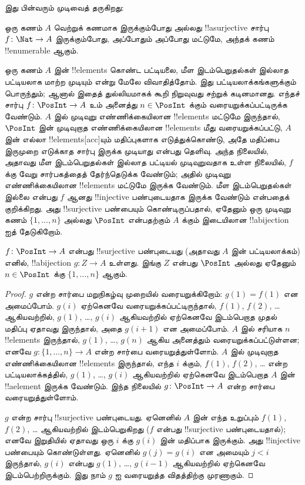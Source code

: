 \documentclass[../../../include/open-logic-section]{subfiles}
\begin{document}
இது பின்வரும் முடிவைத் தருகிறது:

\begin{cor}
ஒரு கணம் $A$ வெற்றுக் கணமாக இருக்கும்போது அல்லது
!!a{surjective} சார்பு $f\colon \Nat \to A$ இருக்கும்போது,
அப்போதும் அப்போது மட்டுமே, அந்தக் கணம் !!{enumerable} ஆகும்.
\end{cor}

ஒரு கணம் $A$ இன் !!{element}s கொண்ட பட்டியலை,
மீள இடம்பெறுதல்கள் இல்லாத பட்டியலாக மாற்ற முடியும் என்று
மேலே விவாதித்தோம். இது பட்டியலாக்கங்களுக்கும் பொருந்தும்;
ஆனால் இதைத் துல்லியமாகக் கூறி நிறுவுவது சற்றுக் கடினமானது.
எந்தச் சார்பு $f\colon \PosInt \to A$ உம்
அனைத்து $n \in
\PosInt$ க்கும் வரையறுக்கப்பட்டிருக்க வேண்டும்.
$A$ இல் முடிவுறு எண்ணிக்கையிலான !!{element}s மட்டுமே இருந்தால்,
$\PosInt$ இன் முடிவுறாத எண்ணிக்கையிலான !!{element}s மீது
வரையறுக்கப்பட்டு, $A$ இன் எல்லா !!{element}s[acc]யும் மதிப்புகளாக
எடுத்துக்கொண்டு, அதே மதிப்பை இருமுறை எடுக்காத சார்பு
இருக்க முடியாது என்பது தெளிவு.
அந்த நிலையில், அதாவது மீள இடம்பெறுதல்கள் இல்லாத பட்டியல்
முடிவுறுவதாக உள்ள நிலையில், $f$ க்கு வேறு சார்பகத்தைத்
தேர்ந்தெடுக்க வேண்டும்; அதில் முடிவுறு எண்ணிக்கையிலான
!!{element}s மட்டுமே இருக்க வேண்டும்.
மீள இடம்பெறுதல்கள் இல்லை என்பது $f$ ஆனது !!{injective}
பண்புடையதாக இருக்க வேண்டும் என்பதைக் குறிக்கிறது.
அது !!{surjective} பண்பையும் கொண்டிருப்பதால்,
ஏதேனும் ஒரு முடிவுறு கணம் $\{1, \dots, n\}$ அல்லது
$\PosInt$ என்பதற்கும் $A$ க்கும் இடையிலான
!!a{bijection} ஐத் தேடுகிறோம்.

\begin{prop}
$f\colon \PosInt \to A$ என்பது !!{surjective} பண்புடையது
(அதாவது $A$ இன் பட்டியலாக்கம்) எனில்,
!!a{bijection} $g\colon Z \to A$ உள்ளது.
இங்கு $Z$ என்பது $\PosInt$ அல்லது ஏதேனும்
$n \in \PosInt$ க்கு $\{1, \dots, n\}$ ஆகும்.
\end{prop}

\begin{proof}
$g$ என்ற சார்பை மறுநிகழ்வு முறையில் வரையறுக்கிறோம்:
$g(1) = f(1)$ என அமைப்போம்.
$g(i)$ ஏற்கெனவே வரையறுக்கப்பட்டிருந்தால்,
$f(1)$, $f(2)$, \dots{} ஆகியவற்றில்,
$g(1)$, \dots, $g(i)$ ஆகியவற்றில் ஏற்கெனவே இடம்பெறாத
முதல் மதிப்பு ஏதாவது இருந்தால், அதை $g(i+1)$ என அமைப்போம்.
$A$ இல் சரியாக $n$ !!{element}s இருந்தால்,
$g(1)$, \dots, $g(n)$ ஆகிய அனைத்தும் வரையறுக்கப்பட்டுள்ளன;
எனவே $g\colon \{1, \dots, n\}
\to A$ என்ற சார்பை வரையறுத்துள்ளோம்.
$A$ இல் முடிவுறாத எண்ணிக்கையிலான !!{element}s இருந்தால்,
எந்த $i$ க்கும், $f(1)$, $f(2)$, \dots{} என்ற பட்டியலாக்கத்தில்,
$g(1)$, \dots, $g(i)$ ஆகியவற்றில் ஏற்கெனவே இடம்பெறாத
$A$ இன் !!a{element} இருக்க வேண்டும்.
இந்த நிலையில் $g\colon \PosInt \to A$ என்ற சார்பை வரையறுத்துள்ளோம்.

$g$ என்ற சார்பு !!{surjective} பண்புடையது.
ஏனெனில் $A$ இன் எந்த உறுப்பும் $f(1)$, $f(2)$, \dots{} ஆகியவற்றில்
இடம்பெறுகிறது ($f$ என்பது !!{surjective} பண்புடையதால்);
எனவே இறுதியில் ஏதாவது ஒரு $i$ க்கு $g(i)$ இன் மதிப்பாக இருக்கும்.
அது !!{injective} பண்பையும் கொண்டுள்ளது.
ஏனெனில் $g(j) = g(i)$ என அமையும் $j < i$ இருந்தால்,
$g(i)$ என்பது $g(1)$, \dots, $g(i-1)$ ஆகியவற்றில்
ஏற்கெனவே இடம்பெற்றிருக்கும்.
இது நாம் $g$ ஐ வரையறுத்த விதத்திற்கு முரணாகும்.
\end{proof}
\end{document}
